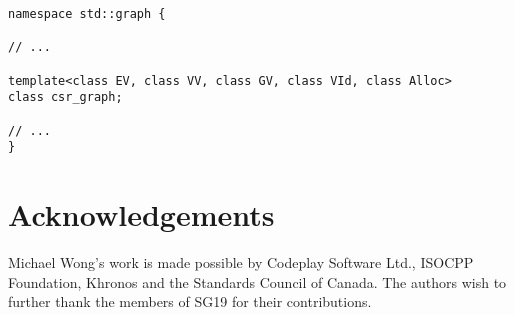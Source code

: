 \documentclass[10pt,onecolumn]{article}
\begin{document}
\begin{lstlisting}
namespace std::graph {

// ...

template<class EV, class VV, class GV, class VId, class Alloc>
class csr_graph;

// ...
}
\end{lstlisting}


\section{Acknowledgements}
Michael Wong's work is made possible by Codeplay Software Ltd., ISOCPP Foundation, Khronos and the Standards Council of Canada.  The authors wish to further thank the members of SG19 for their contributions.

\footnotesize


\normalsize
\end{document}
